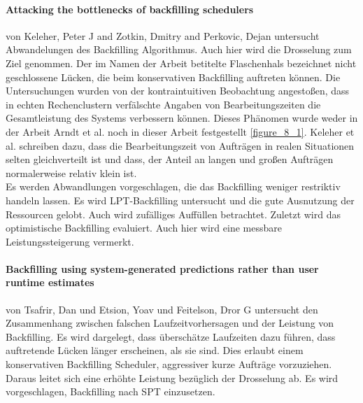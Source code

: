 \paragraph{Attacking the bottlenecks of backfilling schedulers}
von Keleher, Peter J and Zotkin, Dmitry and Perkovic, Dejan \cite{keleher2000attacking} untersucht Abwandelungen des Backfilling Algorithmus. Auch hier wird die Drosselung zum Ziel genommen. Der im Namen der Arbeit betitelte Flaschenhals bezeichnet nicht geschlossene Lücken, die beim konservativen Backfilling auftreten können. Die Untersuchungen wurden von der kontraintuitiven Beobachtung angestoßen, dass in echten Rechenclustern verfälschte Angaben von Bearbeitungszeiten die Gesamtleistung des Systems verbessern können. Dieses Phänomen wurde weder in der Arbeit Arndt et al. \cite{Arn99} noch in dieser Arbeit festgestellt \ref{figure_8_1}. Keleher et al. schreiben dazu, dass die Bearbeitungszeit von Aufträgen in realen Situationen selten gleichverteilt ist und dass, der Anteil an langen und großen Aufträgen normalerweise relativ klein ist.\\
Es werden Abwandlungen vorgeschlagen, die das Backfilling weniger restriktiv handeln lassen. Es wird LPT-Backfilling untersucht und die gute Ausnutzung der Ressourcen gelobt. Auch wird zufälliges Auffüllen betrachtet. Zuletzt wird das optimistische Backfilling evaluiert. Auch hier wird eine messbare Leistungssteigerung vermerkt.

\paragraph{Backfilling using system-generated predictions rather than user runtime estimates} von Tsafrir, Dan und Etsion, Yoav und Feitelson, Dror G untersucht den Zusammenhang zwischen falschen Laufzeitvorhersagen und der Leistung von Backfilling.
Es wird dargelegt, dass überschätze Laufzeiten dazu führen, dass auftretende Lücken länger erscheinen, als sie sind. Dies erlaubt einem konservativen Backfilling Scheduler, aggressiver kurze Aufträge vorzuziehen. Daraus leitet sich eine erhöhte Leistung bezüglich der Drosselung ab. Es wird vorgeschlagen, Backfilling nach SPT einzusetzen. 

\cite{tsafrir2007backfilling}